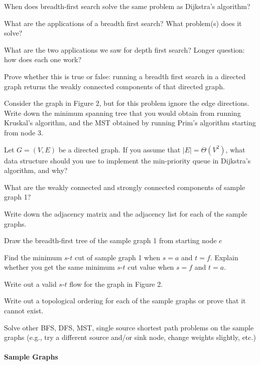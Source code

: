 \documentclass[11  pt]{exam}
\begin{document}
	\begin{questions}
		
		\question When does breadth-first search solve the same problem as Dijkstra's algorithm?
		
		\question What are the applications of a breadth first search? What problem(s) does it solve?
		
		\question What are the two applications we saw for depth first search? Longer question: how does each one work?
		
		\question Prove whether this is true or false: running a breadth first search in a directed graph returns the weakly connected components of that directed graph.
		
		\question Consider the graph in Figure 2, but for this problem ignore the edge directions. Write down the minimum spanning tree that you would obtain from running Kruskal's algorithm, and the MST obtained by running Prim's algorithm starting from node 3.
		
		\question Let $G = (V,E)$ be a directed graph. If you assume that $|E| = \Theta(V^2)$, what data structure should you use to implement the min-priority queue in Dijkstra's algorithm, and why?
		
		\question What are the weakly connected and strongly connected components of sample graph 1?
		
		\question Write down the adjacency matrix and the adjacency list for each of the sample graphs.
		
		\question Draw the breadth-first tree of the sample graph 1 from starting node $e$
		
		\question Find the minimum $s$-$t$ cut of sample graph 1 when $s = a$ and $t = f$. Explain whether you get the same minimum $s$-$t$ cut value when $s = f$ and $t = a$.
		
		\question Write out a valid $s$-$t$ flow for the graph in Figure 2. 
		
		\question Write out a topological ordering for each of the sample graphs or prove that it cannot exist.
		
		\question Solve other BFS, DFS, MST, single source shortest path problems on the sample graphs (e.g., try a different source and/or sink node, change weights slightly, etc.)
		
		
		\paragraph{Sample Graphs}
		

\end{questions}
\end{document}
